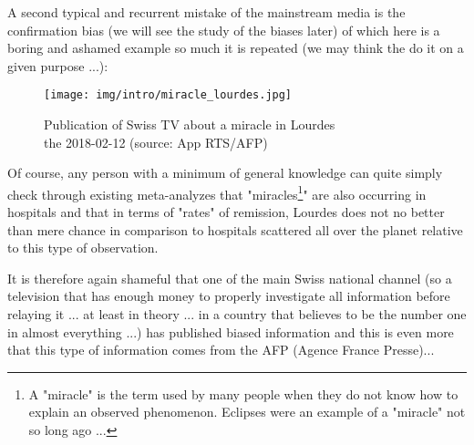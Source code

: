 	A second typical and recurrent mistake of the mainstream media is the confirmation bias (we will see the study of the biases later) of which here is a boring and ashamed example so much it is repeated (we may think the do it on a given purpose ...):
	\begin{figure}[H]
		\centering
		\texttt{[image: img/intro/miracle\_lourdes.jpg]}
		\caption[Publication of Swiss TV on a miracle in Lourdes]{Publication of Swiss TV about a miracle in Lourdes\\ the 2018-02-12 (source: App RTS/AFP)}
	\end{figure}
	Of course, any person with a minimum of general knowledge can quite simply check through existing meta-analyzes that "miracles\footnote{A "miracle" is the term used by many people when they do not know how to explain an observed phenomenon. Eclipses were an example of a "miracle" not so long ago ...}" are also occurring in hospitals and that in terms of "rates" of remission, Lourdes does not no better than mere chance in comparison to hospitals scattered all over the planet relative to this type of observation.

	It is therefore again shameful that one of the main Swiss national channel (so a television that has enough money to properly investigate all information before relaying it ... at least in theory ... in a country that believes to be the number one in almost everything ...) has published biased information and this is even more that this type of information comes from the AFP (Agence France Presse)...
	
